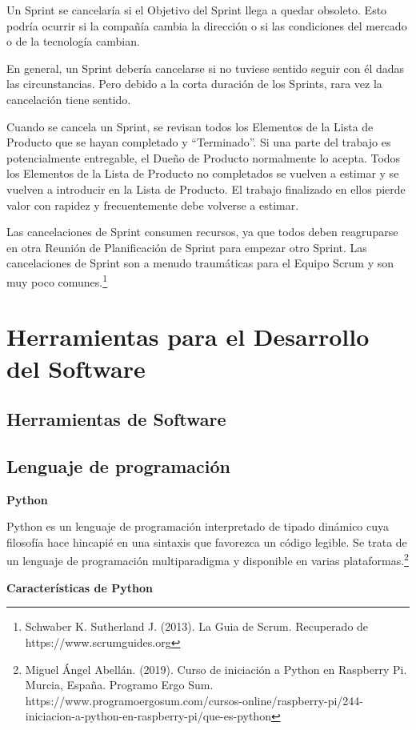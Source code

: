 \documentclass[12pt]{report}%
\begin{document}
Un Sprint se cancelaría si el Objetivo del Sprint llega a quedar obsoleto. Esto podría ocurrir si la compañía cambia la dirección o si las condiciones del mercado o de la tecnología cambian. 

En general, un Sprint debería cancelarse si no tuviese sentido seguir con él dadas las circunstancias. Pero debido a la corta duración de los Sprints, rara vez la cancelación tiene sentido. 

Cuando se cancela un Sprint, se revisan todos los Elementos de la Lista de Producto que se hayan completado y “Terminado”. Si una parte del trabajo es potencialmente entregable, el Dueño de Producto normalmente lo acepta. Todos los Elementos de la Lista de Producto no completados se vuelven a estimar y se vuelven a introducir en la Lista de Producto. El trabajo finalizado en ellos pierde valor con rapidez y frecuentemente debe volverse a estimar. 

Las cancelaciones de Sprint consumen recursos, ya que todos deben reagruparse en otra Reunión de Planificación de Sprint para empezar otro Sprint. Las cancelaciones de Sprint son a menudo traumáticas para el Equipo Scrum y son muy poco comunes.\footnote{Schwaber K. Sutherland J. (2013). La Guia de Scrum. Recuperado de https://www.scrumguides.org}


\newpage

\section{Herramientas para el Desarrollo del Software}
\subsection{Herramientas de Software}
\subsection{Lenguaje de programación}
\textbf{Python}

Python es un lenguaje de programación interpretado de tipado dinámico cuya filosofía hace hincapié en una sintaxis que favorezca un código legible. Se trata de un lenguaje de programación multiparadigma y disponible en varias plataformas.\footnote{Miguel Ángel Abellán. (2019). Curso de iniciación a Python en Raspberry Pi. Murcia, España. Programo Ergo Sum.
https://www.programoergosum.com/cursos-online/raspberry-pi/244-iniciacion-a-python-en-raspberry-pi/que-es-python}

   \textbf{Características de Python}
   
\end{document}

